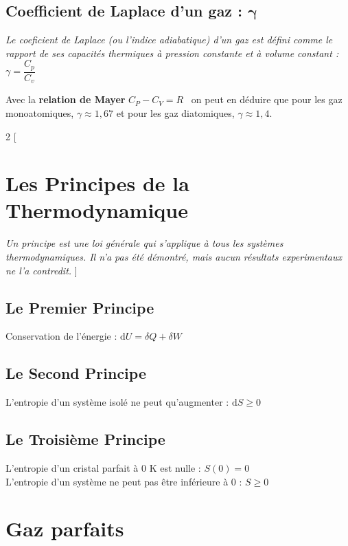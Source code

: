 \documentclass[a4paper,12pt]{article}
\newcommand{\diff}{\mathrm{d}} %
\begin{document}
\subsection*{Coefficient de Laplace d'un gaz : $\bm{\gamma}$}

\textit{Le coeficient de Laplace (ou l'indice adiabatique) d'un gaz est défini comme le rapport de
ses capacités thermiques à pression constante et à volume constant :} $\boxed{\gamma = \dfrac{C_p}{C_v}}$

Avec la \textbf{relation de Mayer} $C_P - C_V = R$ \ on peut en déduire que pour les gaz monoatomiques, $\gamma \approx 1,67$ et pour les gaz diatomiques, $\gamma \approx 1,4$.



\begin{multicols}{2}
[
    \section{Les Principes de la Thermodynamique}
    \textit{Un principe est une loi générale qui s'applique à tous les systèmes thermodynamiques. Il n'a pas été démontré, mais aucun résultats experimentaux ne l'a contredit.}
]

\subsection*{Le Premier Principe}
Conservation de l'énergie : $\boxed{\diff U = \delta Q + \delta W}$

\subsection*{Le Second Principe}
L'entropie d'un système isolé ne peut qu'augmenter : $\boxed{\diff S \geq 0}$

\subsection*{Le Troisième Principe}
L'entropie d'un cristal parfait à 0 K est nulle : $\boxed{S(0) = 0}$\\
L'entropie d'un système ne peut pas être inférieure à 0 : $\boxed{S \geq 0}$

\end{multicols}



\section{Gaz parfaits}
\end{document}
